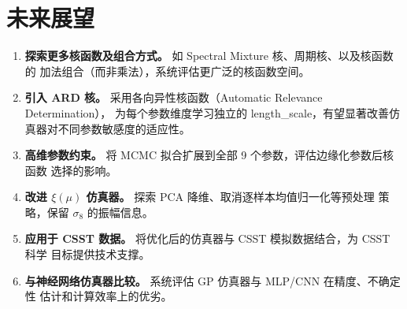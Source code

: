 \section{未来展望}\label{sec:future-work}

\begin{enumerate}
  \item \textbf{探索更多核函数及组合方式。} 如 Spectral Mixture 核、周期核、以及核函数的
    加法组合（而非乘法），系统评估更广泛的核函数空间。
  \item \textbf{引入 ARD 核。} 采用各向异性核函数（Automatic Relevance Determination），
    为每个参数维度学习独立的 length\_scale，有望显著改善仿真器对不同参数敏感度的适应性。
  \item \textbf{高维参数约束。} 将 MCMC 拟合扩展到全部 9 个参数，评估边缘化参数后核函数
    选择的影响。
  \item \textbf{改进 $\xi(\mu)$ 仿真器。} 探索 PCA 降维、取消逐样本均值归一化等预处理
    策略，保留 $\sigma_8$ 的振幅信息。
  \item \textbf{应用于 CSST 数据。} 将优化后的仿真器与 CSST 模拟数据结合，为 CSST 科学
    目标提供技术支撑。
  \item \textbf{与神经网络仿真器比较。} 系统评估 GP 仿真器与 MLP/CNN 在精度、不确定性
    估计和计算效率上的优劣。
\end{enumerate}

